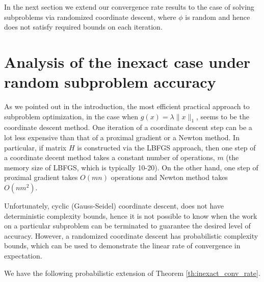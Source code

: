 \documentclass[11pt]{article}
\numberwithin{equation}{section}
\begin{document}
In the next section we extend our convergence rate results to the case of solving subproblems via randomized coordinate descent,  where
 $\phi$ is random and hence does not satisfy required bounds on each iteration. 

\section{Analysis of the inexact case under random subproblem accuracy}\label{sec:random}
As we pointed out in the introduction, the most efficient  practical approach to subproblem optimization, in the case when  $g(x)=\lambda \|x\|_1$, seems to be the coordinate descent method. One iteration of a coordinate descent step can be a lot less expensive 
than that of a proximal gradient or a Newton method. In particular, if matrix $H$ is constructed via the 
LBFGS approach, then one step of a coordinate decent
method takes a constant number 
of operations, $m$ (the memory size of LBFGS, which is typically 10-20). 
On the other hand, one step of proximal gradient takes $O(mn)$ operations and Newton method takes $O(nm^2)$. 

Unfortunately,  cyclic (Gauss-Seidel) coordinate descent, does not have deterministic complexity bounds, hence it is not possible to know when the work on a particular subproblem can be terminated to guarantee the desired  level of accuracy. However, a randomized coordinate descent has probabilistic complexity bounds, which can be used to demonstrate the linear rate of convergence in expectation.

We have the following probabilistic extension of Theorem \ref{th:inexact_conv_rate}.
\end{document}
